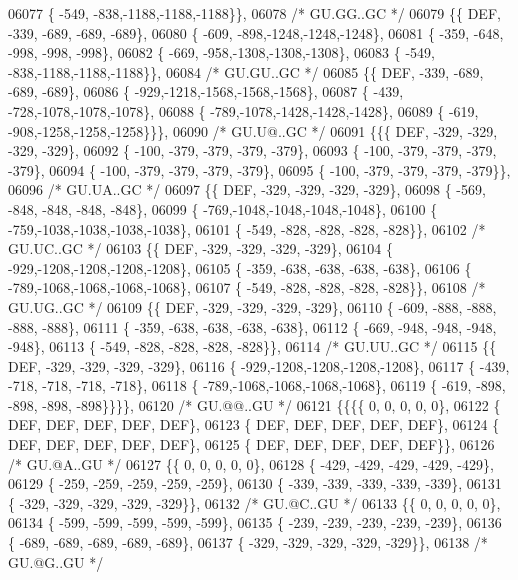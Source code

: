 \begin{DoxyCode}
06077 \{ -549, -838,-1188,-1188,-1188\}\},
06078 \textcolor{comment}{/* GU.GG..GC */}
06079 \{\{  DEF, -339, -689, -689, -689\},
06080 \{ -609, -898,-1248,-1248,-1248\},
06081 \{ -359, -648, -998, -998, -998\},
06082 \{ -669, -958,-1308,-1308,-1308\},
06083 \{ -549, -838,-1188,-1188,-1188\}\},
06084 \textcolor{comment}{/* GU.GU..GC */}
06085 \{\{  DEF, -339, -689, -689, -689\},
06086 \{ -929,-1218,-1568,-1568,-1568\},
06087 \{ -439, -728,-1078,-1078,-1078\},
06088 \{ -789,-1078,-1428,-1428,-1428\},
06089 \{ -619, -908,-1258,-1258,-1258\}\}\},
06090 \textcolor{comment}{/* GU.U@..GC */}
06091 \{\{\{  DEF, -329, -329, -329, -329\},
06092 \{ -100, -379, -379, -379, -379\},
06093 \{ -100, -379, -379, -379, -379\},
06094 \{ -100, -379, -379, -379, -379\},
06095 \{ -100, -379, -379, -379, -379\}\},
06096 \textcolor{comment}{/* GU.UA..GC */}
06097 \{\{  DEF, -329, -329, -329, -329\},
06098 \{ -569, -848, -848, -848, -848\},
06099 \{ -769,-1048,-1048,-1048,-1048\},
06100 \{ -759,-1038,-1038,-1038,-1038\},
06101 \{ -549, -828, -828, -828, -828\}\},
06102 \textcolor{comment}{/* GU.UC..GC */}
06103 \{\{  DEF, -329, -329, -329, -329\},
06104 \{ -929,-1208,-1208,-1208,-1208\},
06105 \{ -359, -638, -638, -638, -638\},
06106 \{ -789,-1068,-1068,-1068,-1068\},
06107 \{ -549, -828, -828, -828, -828\}\},
06108 \textcolor{comment}{/* GU.UG..GC */}
06109 \{\{  DEF, -329, -329, -329, -329\},
06110 \{ -609, -888, -888, -888, -888\},
06111 \{ -359, -638, -638, -638, -638\},
06112 \{ -669, -948, -948, -948, -948\},
06113 \{ -549, -828, -828, -828, -828\}\},
06114 \textcolor{comment}{/* GU.UU..GC */}
06115 \{\{  DEF, -329, -329, -329, -329\},
06116 \{ -929,-1208,-1208,-1208,-1208\},
06117 \{ -439, -718, -718, -718, -718\},
06118 \{ -789,-1068,-1068,-1068,-1068\},
06119 \{ -619, -898, -898, -898, -898\}\}\}\},
06120 \textcolor{comment}{/* GU.@@..GU */}
06121 \{\{\{\{    0,    0,    0,    0,    0\},
06122 \{  DEF,  DEF,  DEF,  DEF,  DEF\},
06123 \{  DEF,  DEF,  DEF,  DEF,  DEF\},
06124 \{  DEF,  DEF,  DEF,  DEF,  DEF\},
06125 \{  DEF,  DEF,  DEF,  DEF,  DEF\}\},
06126 \textcolor{comment}{/* GU.@A..GU */}
06127 \{\{    0,    0,    0,    0,    0\},
06128 \{ -429, -429, -429, -429, -429\},
06129 \{ -259, -259, -259, -259, -259\},
06130 \{ -339, -339, -339, -339, -339\},
06131 \{ -329, -329, -329, -329, -329\}\},
06132 \textcolor{comment}{/* GU.@C..GU */}
06133 \{\{    0,    0,    0,    0,    0\},
06134 \{ -599, -599, -599, -599, -599\},
06135 \{ -239, -239, -239, -239, -239\},
06136 \{ -689, -689, -689, -689, -689\},
06137 \{ -329, -329, -329, -329, -329\}\},
06138 \textcolor{comment}{/* GU.@G..GU */}

\end{DoxyCode}
